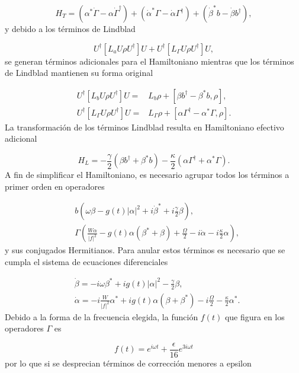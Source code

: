 \documentclass[10pt,a4paper]{report}
\begin{document}
\begin{equation}
H_{T} = (\alpha^*\dot{\Gamma} - \alpha\dot{\Gamma}^\dagger) +(\dot{\alpha}^*\Gamma - \dot{\alpha}\Gamma^\dagger) +(\dot{\beta}^*b - \dot{\beta}b^\dagger),
\end{equation} y debido a los términos de Lindblad

\begin{equation}
U^\dagger [L_aU\rho U^\dagger]U + U^\dagger [L_\Gamma U\rho U^\dagger]U,
\end{equation} se generan términos adicionales para el Hamiltoniano mientras que los términos de Lindblad mantienen su forma original

\begin{align}
U^\dagger [L_bU\rho U^\dagger]U=& L_b\rho + [\beta b^\dagger - \beta^* b,\rho],\\
U^\dagger [L_\Gamma U\rho U^\dagger]U =& L_\Gamma \rho + [ \alpha \Gamma^\dagger - \alpha^* \Gamma,\rho].
\end{align} La transformación de los términos Lindblad resulta en  Hamiltoniano efectivo adicional

\begin{equation}
H_L = -\frac{\gamma}{2}(\beta b^\dagger + \beta^* b) -\frac{\kappa}{2}( \alpha \Gamma^\dagger + \alpha^* \Gamma).
\end{equation} A fin de simplificar el Hamiltoniano, es necesario agrupar todos los términos a primer orden en operadores

\begin{align}
&b(\omega\beta - g(t)|\alpha|^2 + i\dot{\beta}^* + i\frac{\gamma}{2}\beta),\\
&\Gamma(\frac{W\alpha}{|f|^2} -g(t)\alpha(\beta^*+\beta) + \frac{\Omega}{2}-i\dot{\alpha} - i\frac{\kappa}{2}\alpha),
\end{align} y sus conjugados Hermitianos. Para anular estos términos es necesario que se cumpla el sistema de ecuaciones diferenciales

\begin{align}
&\dot{\beta} = -i\omega\beta^* + ig(t)|\alpha|^2 - \frac{\gamma}{2}\beta,\\
&\dot{\alpha} = -i \frac{W}{|f|^2}\alpha^* + ig(t)\alpha(\beta + \beta^*) -i \frac{\Omega}{2} - \frac{\kappa}{2}\alpha^*.
\end{align} Debido a la forma de la frecuencia elegida, la función $f(t)$ que figura en los operadores $\Gamma$ es

\begin{equation}
f(t) = e^{i\omega t} + \frac{\epsilon}{16}e^{3i\omega t}
\end{equation} por lo que si se desprecian términos de corrección menores a epsilon
\end{document}
